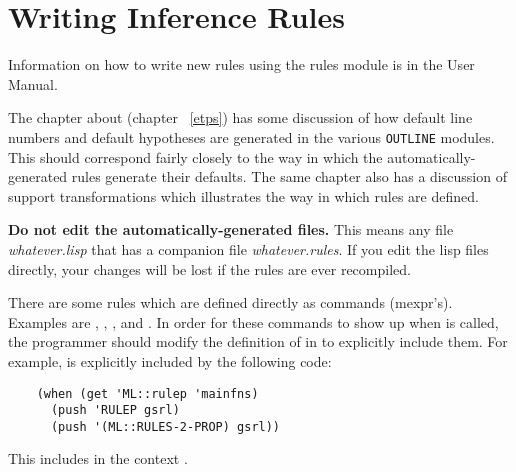 \chapter{Writing Inference Rules}

Information on how to write new rules using the rules module
is in the User Manual.

The chapter about \ETPS (chapter ~\ref{etps}) has some discussion
of how default line numbers and default hypotheses are generated in 
the various {\tt OUTLINE} modules. This should correspond fairly 
closely to the way in which the automatically-generated rules
generate their defaults. The same chapter also has a discussion of
support transformations which illustrates the way in which rules are
defined.

{\bf Do not edit the automatically-generated files.} This means any file 
{\it whatever.lisp} that has a companion file {\it whatever.rules}. If you edit 
the lisp files directly, your changes will be lost if the rules are ever recompiled.

There are some rules which are defined directly as commands (mexpr's).
Examples are , , , 
 and .
In order for these commands to show up when 
is called, the programmer should modify the definition of 
in  to explicitly include them.
For example,  is explicitly included by the following code:
\begin{verbatim}
    (when (get 'ML::rulep 'mainfns)
      (push 'RULEP gsrl)
      (push '(ML::RULES-2-PROP) gsrl))
\end{verbatim}
This includes  in the context .


